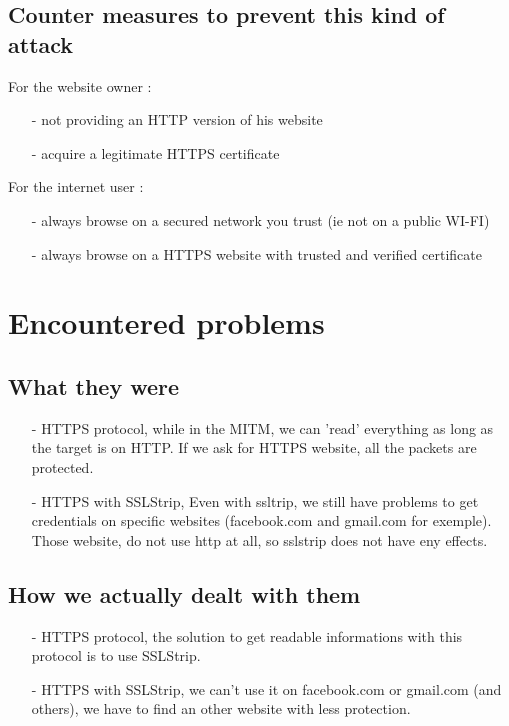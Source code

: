 \documentclass[a4paper, 11pt, oneside]{article}
\begin{document}
\subsection{Counter measures to prevent this kind of attack}
For the website owner : \\
\begin{itemize}
    \item[-] not providing an HTTP version of his website\\
    \item[-] acquire a legitimate HTTPS certificate\\
\end{itemize}

For the internet user : \\
\begin{itemize}
    \item[-] always browse on a secured network you trust (ie not on a public WI-FI)\\
    \item[-] always browse on a HTTPS website with trusted and verified certificate\\
\end{itemize}

\section{Encountered problems}

\subsection{What they were}
\begin{itemize}
    \item[-] HTTPS protocol, while in the MITM, we can 'read' everything as long as the target is on HTTP. If we ask for HTTPS website, all the packets are protected. \\
    \item[-] HTTPS with SSLStrip, Even with ssltrip, we still have problems to get credentials on specific websites (facebook.com and gmail.com for exemple). Those website, do not use http at all, so sslstrip does not have eny effects.\\
\end{itemize}

\subsection{How we actually dealt with them}
\begin{itemize}
    \item[-] HTTPS protocol, the solution to get readable informations with this protocol is to use SSLStrip.\\
    \item[-] HTTPS with SSLStrip, we can't use it on facebook.com or gmail.com (and others), we have to find an other website with less protection.\\
\end{itemize}
    
\end{document}
